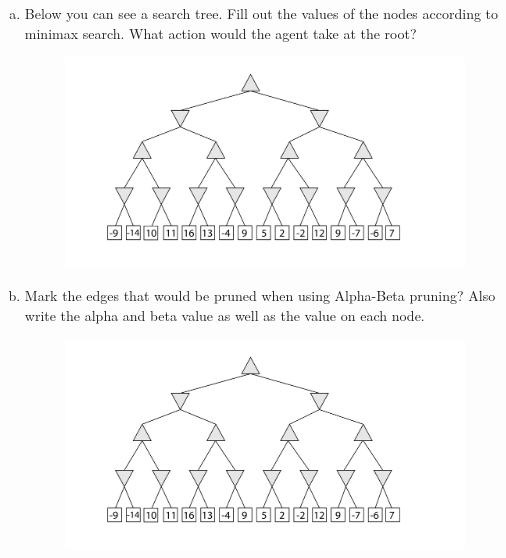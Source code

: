 \documentclass[a4paper]{article}
\begin{document}
\begin{enumerate}[(a)]
\item Below you can see a search tree. Fill out the values of the nodes according to minimax search. What action would the agent take at the root?

\begin{center}
\begin{figure}[h!]
\centering
\includegraphics[width=1.25\textwidth]{figs/minmax}
\end{figure}
\end{center}

\newpage



\item Mark the edges that would be pruned when using Alpha-Beta pruning? Also write the alpha and beta value as well as the value on each node. 

\begin{center}
\begin{figure}[h!]
\centering
\includegraphics[width=1.25\textwidth]{figs/minmax}
\end{figure}
\end{center}


\end{enumerate}
\end{document}
